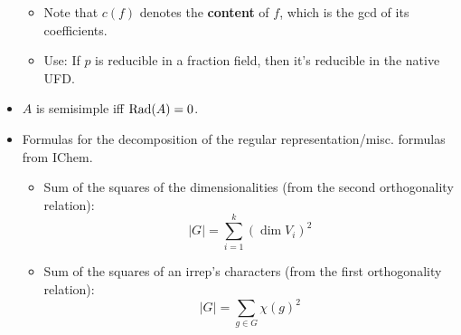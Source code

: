 \documentclass[../notes.tex]{subfiles}
\begin{document}
\begin{itemize}
\begin{itemize}
        \item Note that $c(f)$ denotes the \textbf{content} of $f$, which is the gcd of its coefficients.
        \item Use: If $p$ is reducible in a fraction field, then it's reducible in the native UFD.
    \end{itemize}
    \item $A$ is semisimple iff $\operatorname{Rad}(A)=0$.
    \item Formulas for the decomposition of the regular representation/misc. formulas from IChem.
    \begin{itemize}
        \item Sum of the squares of the dimensionalities (from the second orthogonality relation):
        \begin{equation*}
            |G| = \sum_{i=1}^k(\dim V_i)^2
        \end{equation*}
        \item Sum of the squares of an irrep's characters (from the first orthogonality relation):
        \begin{equation*}
            |G| = \sum_{g\in G}\chi(g)^2
        \end{equation*}
    \end{itemize}
\end{itemize}
\end{document}
